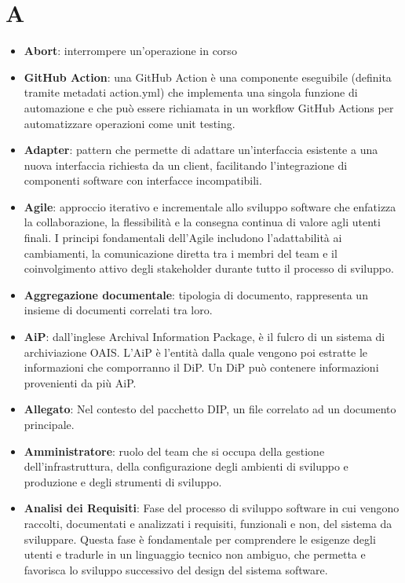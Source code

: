 \documentclass[a4paper,12pt]{article}
\begin{document}
\tableofcontents

\newpage

\section{A}
\begin{itemize}
    \item \textbf{Abort}: interrompere un'operazione in corso
    \item \textbf{GitHub Action}: una GitHub Action è una componente eseguibile (definita tramite metadati action.yml) che implementa una singola funzione di automazione e che può essere richiamata in un workflow GitHub Actions per automatizzare operazioni come unit testing.
    \item \textbf{Adapter}: pattern che permette di adattare un'interfaccia esistente a una nuova interfaccia richiesta da un client, facilitando l'integrazione di componenti software con interfacce incompatibili.
    \item \textbf{Agile}: approccio iterativo e incrementale allo sviluppo software che enfatizza la collaborazione, la flessibilità e la consegna continua di valore agli utenti finali. I principi fondamentali dell'Agile includono l'adattabilità ai cambiamenti, la comunicazione diretta tra i membri del team e il coinvolgimento attivo degli stakeholder durante tutto il processo di sviluppo.
    \item \textbf{Aggregazione documentale}: tipologia di documento, rappresenta un insieme di documenti correlati tra loro.
    \item \textbf{AiP}: dall'inglese Archival Information Package, è il fulcro di un sistema di archiviazione OAIS. L'AiP è l'entità dalla quale vengono poi estratte le informazioni che comporranno il DiP. Un DiP può contenere informazioni provenienti da più AiP. 
    \item \textbf{Allegato}: Nel contesto del pacchetto DIP, un file correlato ad un documento principale.
    \item \textbf{Amministratore}: ruolo del team che si occupa della gestione dell'infrastruttura, della configurazione degli ambienti di sviluppo e produzione e degli strumenti di sviluppo.
    \item \textbf{Analisi dei Requisiti}: Fase del processo di sviluppo software in cui vengono raccolti, documentati e analizzati i requisiti, funzionali e non, del sistema da sviluppare. Questa fase è fondamentale per comprendere le esigenze degli utenti e tradurle in un linguaggio tecnico non ambiguo, che permetta e favorisca lo sviluppo successivo del design del sistema software.

\end{itemize}
\end{document}
